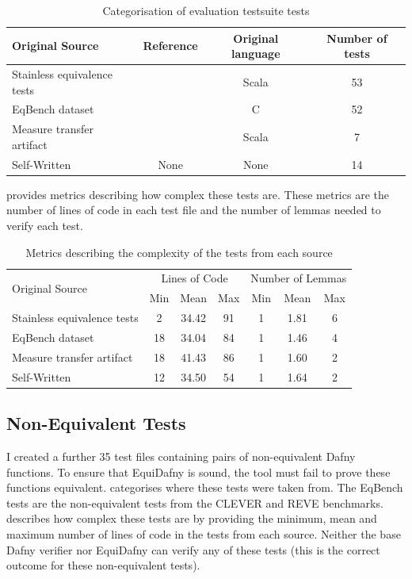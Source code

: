 \begin{table}[ht]
  \centering
  \begin{tabular}{ lccc }
    \toprule
    Original Source & Reference & Original language & Number of tests \\
    \midrule
    Stainless equivalence tests & \parencite{StainlessFrontendsBenchmarks} & Scala & 53 \\
    EqBench dataset & \parencite{badihiEqBenchDatasetEquivalent2021} & C & 52 \\
    Measure transfer artifact & \parencite{milovancevicProvingTerminationMeasure2025} & Scala & 7 \\
    Self-Written & None & None & 14 \\
    \bottomrule
  \end{tabular}
  \caption{Categorisation of evaluation testsuite tests}
  \label{tbl:testsuite-categorisation}
\end{table}

 provides metrics describing how complex these tests are. These metrics are the number of lines of code in each test file and the number of lemmas needed to verify each test. 

\begin{table}[ht]
  \centering
  \begin{tabular}{ lcccccc }
    \toprule
    \multirow{2}{*}{Original Source} & \multicolumn{3}{c}{Lines of Code} & \multicolumn{3}{c}{Number of Lemmas} \\
    & Min & Mean & Max & Min & Mean & Max \\
    \midrule
    Stainless equivalence tests & 2 & 34.42 & 91 & 1 & 1.81 & 6 \\
    EqBench dataset & 18 & 34.04 & 84 & 1 & 1.46 & 4 \\
    Measure transfer artifact & 18 & 41.43 & 86 & 1 & 1.60 & 2 \\
    Self-Written & 12 & 34.50 & 54 & 1 & 1.64 & 2 \\
    \bottomrule
  \end{tabular}
  \caption{Metrics describing the complexity of the tests from each source}
  \label{tbl:testsuite-loc-lemmacount}
\end{table}

\subsection{Non-Equivalent Tests}

I created a further 35 test files containing pairs of non-equivalent Dafny functions. To ensure that EquiDafny is sound, the tool must fail to prove these functions equivalent.  categorises where these tests were taken from. The EqBench tests are the non-equivalent tests from the CLEVER and REVE benchmarks.  describes how complex these tests are by providing the minimum, mean and maximum number of lines of code in the tests from each source. Neither the base Dafny verifier nor EquiDafny can verify any of these tests (this is the correct outcome for these non-equivalent tests). 

